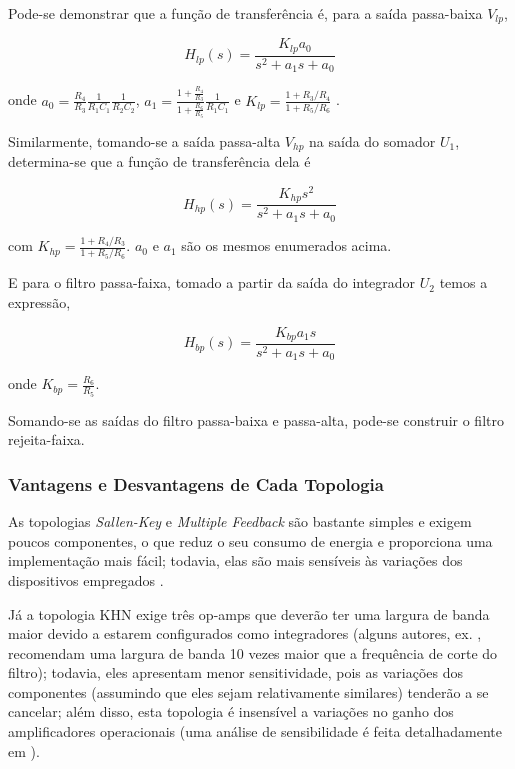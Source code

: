 Pode-se demonstrar que a função de transferência é, para a saída passa-baixa $V_{lp}$,

\begin{equation}
H_{lp}(s) = \frac{K_{lp} a_0}{s^2 + a_1 s + a_0}
\end{equation}

onde $a_0 = \frac{R_4}{R_3} \frac{1}{R_1 C_1} \frac{1}{R_2 C_2}$, $a_1 = \frac{1+\frac{R_4}{R_3}}{1+\frac{R_6}{R_5}} \frac{1}{R_1 C_1}$ e $K_{lp} = \frac{1+R_3/R_4}{1+R_5/R_6}$ \cite{rowell}.

Similarmente, tomando-se a saída passa-alta $V_{hp}$ na saída do somador $U_1$, determina-se que a função de transferência dela é 

\begin{equation}
H_{hp}(s) = \frac{K_{hp} s^2}{s^2 + a_1 s + a_0}
\end{equation}

com $K_{hp} = \frac{1+R_4/R_3}{1+R_5/R_6}$. $a_0$ e $a_1$ são os mesmos enumerados acima.

E para o filtro passa-faixa, tomado a partir da saída do integrador $U_2$ temos a expressão,

\begin{equation}
H_{bp}(s) = \frac{K_{bp} a_1 s}{s^2 + a_1 s + a_0}
\end{equation}

onde $K_{bp} = \frac{R_6}{R_5}$.

Somando-se as saídas do filtro passa-baixa e passa-alta, pode-se construir o filtro rejeita-faixa.

\subsubsection{Vantagens e Desvantagens de Cada Topologia}
As topologias \textit{Sallen-Key} e \textit{Multiple Feedback} são bastante simples e exigem poucos componentes, o que reduz o seu consumo de energia e proporciona uma implementação mais fácil; todavia, elas são mais sensíveis às variações dos dispositivos empregados \cite{an738} \cite{an1762}. 

Já a topologia KHN exige três op-amps que deverão ter uma largura de banda maior devido a estarem configurados como integradores (alguns autores, ex. \cite{jung}, recomendam uma largura de banda 10 vezes maior que a frequência de corte do filtro); todavia, eles apresentam menor sensitividade, pois as variações dos componentes (assumindo que eles sejam relativamente similares) tenderão a se cancelar; além disso, esta topologia é insensível a variações no ganho dos amplificadores operacionais (uma análise de sensibilidade é feita detalhadamente em \cite{khn}).

